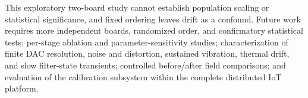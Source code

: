 This exploratory two-board study cannot establish population scaling or statistical significance, and fixed ordering leaves drift as a confound. Future work requires more independent boards, randomized order, and confirmatory statistical tests; per-stage ablation and parameter-sensitivity studies; characterization of finite DAC resolution, noise and distortion, sustained vibration, thermal drift, and slow filter-state transients; controlled before/after field comparisons; and evaluation of the calibration subsystem within the complete distributed IoT platform.
